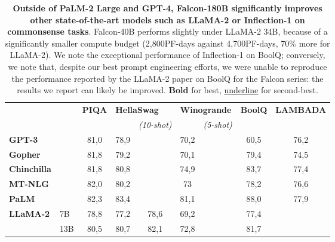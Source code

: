 \documentclass{article}
\DeclareRobustCommand{\performance}[1]{\textcolor{JungleGreen}{#1}}
\begin{document}
\begin{table}[t]
\caption{\textbf{\performance{Outside of PaLM-2 Large and GPT-4, Falcon-180B significantly improves other state-of-the-art models such as LLaMA-2 or Inflection-1 on commonsense tasks}}. Falcon-40B performs slightly under LLaMA-2 34B, because of a significantly smaller compute budget (2,800PF-days against 4,700PF-days, 70\% more for LLaMA-2). We note the exceptional performance of Inflection-1 on BoolQ; conversely, we note that, despite our best prompt engineering efforts, we were unable to reproduce the performance reported by the LLaMA-2 paper on BoolQ for the Falcon series: the results we report can likely be improved. \textbf{Bold} for best, \underline{underline} for second-best.}
\label{tab:broad_tasks}
\vspace{0.1in}
\centering
\begin{tabular}{llccccccc}
\toprule
                      &      & \textbf{PIQA} & \multicolumn{2}{l}{\textbf{HellaSwag}} & \multicolumn{2}{l}{\textbf{Winogrande}} & \textbf{BoolQ} & \textbf{LAMBADA} \\
                      &      &               &                 & \textit{(10-shot)}   &                  & \textit{(5-shot)}    &                &                  \\ \midrule
\textbf{GPT-3}        &      & 81,0          & 78,9            &                      & 70,2             &                      & 60,5           & 76,2             \\
\textbf{Gopher}       &      & 81,8          & 79,2            &                      & 70,1             &                      & 79,4           & 74,5             \\
\textbf{Chinchilla}   &      & 81,8          & 80,8            &                      & 74,9             &                      & 83,7           & 77,4             \\
\textbf{MT-NLG}       &      & 82,0          & 80,2            &                      & 73               &                      & 78,2           & 76,6             \\
\textbf{PaLM}         &      & 82,3          & 83,4            &                      & 81,1             &                      & 88,0           & 77,9             \\
\textbf{LLaMA-2}      & 7B   & 78,8          & 77,2            & 78,6                 & 69,2             &                      & 77,4           &                  \\
\textbf{}             & 13B  & 80,5          & 80,7            & 82,1                 & 72,8             &                      & 81,7           &                  \\

\end{tabular}
\end{table}
\end{document}
